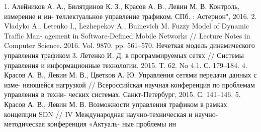 1. Алейников А. А., Билятдинов К. З., Красов А. В., Левин М. В. Контроль, измерение и ин-
теллектуальное управление трафиком. СПб. : Астерион", 2016.
2. Vladyko A., Letenko I., Lezhepekov A., Buinevich M. Fuzzy Model of Dynamic Traffic Man-
agement in Software-Defined Mobile Networks // Lecture Notes in Computer Science. 2016. Vol. 9870.
pp. 561–570.
Нечеткая
модель
динамического
управления
трафиком
3. Летенко И. Д.
в программируемых сетях // Системы управления и информационные технологии. 2015.
Т. 62. No 4.1. С. 179–184.
4. Красов А. В., Левин М. В., Цветков А. Ю. Управления сетями передачи данных с изме-
няющейся нагрузкой // Всероссийская научная конференция по проблемам управления в техни-
ческих системах. Санкт-Петербург, 2015. С. 141–146.
5. Красов А. В., Левин М. В. Возможности управления трафиком в рамках концепции
SDN // IV Международная научно-техническая и научно-методическая конференция «Актуаль-
ные проблемы ин
